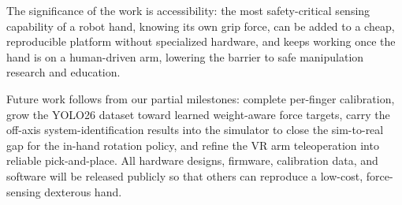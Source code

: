 \documentclass[acmlarge,screen,nonacm]{acmart}
\begin{document}
The significance of the work is accessibility: the most safety-critical sensing
capability of a robot hand, knowing its own grip force, can be added to a cheap,
reproducible platform without specialized hardware, and keeps working once the
hand is on a human-driven arm, lowering the barrier to safe manipulation research
and education.

Future work follows from our partial milestones: complete per-finger
calibration, grow the YOLO26 dataset toward learned weight-aware force targets,
carry the off-axis system-identification results into the simulator to close the
sim-to-real gap for the in-hand rotation policy, and refine the VR arm
teleoperation into reliable pick-and-place. All hardware designs, firmware,
calibration data, and software will be released publicly so that others can
reproduce a low-cost, force-sensing dexterous hand.



\end{document}
